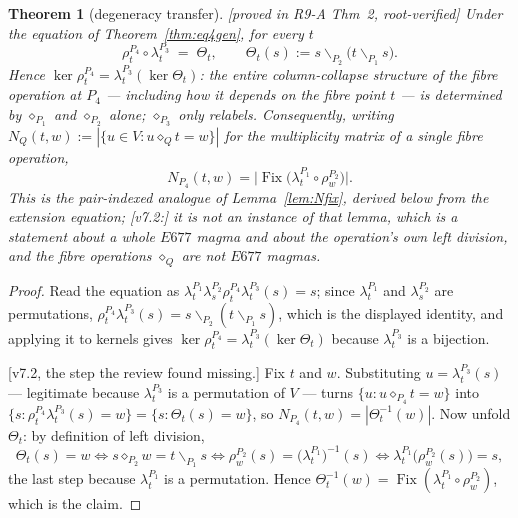 \documentclass[11pt]{article}
\theoremstyle{plain}
\newtheorem{theorem}{Theorem}[section]
\theoremstyle{definition}
\theoremstyle{remark}
\numberwithin{equation}{section}
\newcommand{\Fix}{\operatorname{Fix}}
\newcommand{\statusbox}[1]{{\small\sloppy\textsf{[#1]}}}
\newcommand{\PROVED}[1]{\statusbox{proved in #1, root-verified}}
\begin{document}
\begin{theorem}[degeneracy transfer]\label{thm:transfer}
\PROVED{R9-A Thm~2}
Under the equation of Theorem~\ref{thm:eq4gen}, for every $t$
\[
  \rho^{P_4}_t\circ\lambda^{P_3}_t \;=\; \Theta_t,
  \qquad \Theta_t(s) := s\backslash_{P_2}\bigl(t\backslash_{P_1}s\bigr).
\]
Hence $\ker\rho^{P_4}_t = \lambda^{P_3}_t(\ker\Theta_t)$: \emph{the entire
column-collapse structure of the fibre operation at $P_4$ --- including how it
depends on the fibre point $t$ --- is determined by $\diamond_{P_1}$ and
$\diamond_{P_2}$ alone; $\diamond_{P_3}$ only relabels.} Consequently, writing
$N_{Q}(t,w) := |\{u\in V : u\diamond_{Q}t = w\}|$ for the multiplicity matrix of
a single fibre operation,
\[
  N_{P_4}(t,w) = \bigl|\Fix\bigl(\lambda^{P_1}_t\circ\rho^{P_2}_w\bigr)\bigr| .
\]
This is the pair-indexed \emph{analogue} of Lemma~\ref{lem:Nfix}, derived below
from the extension equation; [v7.2:] it is \emph{not} an instance of that lemma,
which is a statement about a whole $E677$ magma and about the operation's own
left division, and the fibre operations $\diamond_{Q}$ are not $E677$ magmas.
\end{theorem}

\begin{proof}
Read the equation as
$\lambda^{P_1}_t\lambda^{P_2}_s\rho^{P_4}_t\lambda^{P_3}_t(s) = s$; since
$\lambda^{P_1}_t$ and $\lambda^{P_2}_s$ are permutations,
$\rho^{P_4}_t\lambda^{P_3}_t(s) = s\backslash_{P_2}(t\backslash_{P_1}s)$, which
is the displayed identity, and applying it to kernels gives
$\ker\rho^{P_4}_t = \lambda^{P_3}_t(\ker\Theta_t)$ because $\lambda^{P_3}_t$ is a
bijection.

[v7.2, the step the review found missing.] Fix $t$ and $w$. Substituting
$u = \lambda^{P_3}_t(s)$ --- legitimate because $\lambda^{P_3}_t$ is a
permutation of $V$ --- turns $\{u : u\diamond_{P_4}t = w\}$ into
$\{s : \rho^{P_4}_t\lambda^{P_3}_t(s) = w\} = \{s : \Theta_t(s) = w\}$, so
$N_{P_4}(t,w) = |\Theta_t^{-1}(w)|$. Now unfold $\Theta_t$: by definition of
left division,
\[
  \Theta_t(s) = w
  \iff s\diamond_{P_2}w = t\backslash_{P_1}s
  \iff \rho^{P_2}_w(s) = \bigl(\lambda^{P_1}_t\bigr)^{-1}(s)
  \iff \lambda^{P_1}_t\bigl(\rho^{P_2}_w(s)\bigr) = s ,
\]
the last step because $\lambda^{P_1}_t$ is a permutation. Hence
$\Theta_t^{-1}(w) = \Fix(\lambda^{P_1}_t\circ\rho^{P_2}_w)$, which is the claim.
\end{proof}
\end{document}
